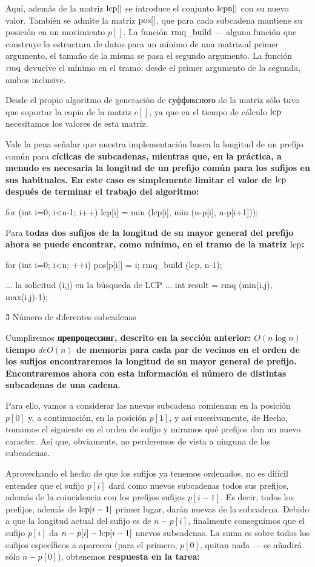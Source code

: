 Aquí, además de la matriz $\rm lcp[]$ se introduce el conjunto $\rm lcpn[]$ con su nuevo valor. También se admite la matriz $\rm pos[]$, que para cada subcadena mantiene su posición en un movimiento $p[]$. La función $\rm rmq\_build$ --- alguna función que construye la estructura de datos para un mínimo de una matriz-al primer argumento, el tamaño de la misma se pasa el segundo argumento. La función $\rm rmq$ devuelve el mínimo en el tramo: desde el primer argumento de la segunda, ambos inclusive.

Desde el propio algoritmo de generación de суффиксного de la matriz sólo tuvo que soportar la copia de la matriz $c[]$, ya que en el tiempo de cálculo $\rm lcp$ necesitamos los valores de esta matriz.

Vale la pena señalar que nuestra implementación busca la longitud de un prefijo común para \bf{cíclicas de subcadenas}, mientras que, en la práctica, a menudo es necesaria la longitud de un prefijo común para los sufijos en sus habituales. En este caso es simplemente limitar el valor de $\rm lcp$ después de terminar el trabajo del algoritmo:

\code
for (int i=0; i<n-1; i++)
lcp[i] = min (lcp[i], min (n-p[i], n-p[i+1]));
\endcode

Para \bf{todas} dos sufijos de la longitud de su mayor general del prefijo ahora se puede encontrar, como mínimo, en el tramo de la matriz $\rm lcp$:

\code
for (int i=0; i<n; ++i)
pos[p[i]] = i;
rmq_build (lcp, n-1);

... la solicitud (i,j) en la búsqueda de LCP ...
int result = rmq (min(i,j), max(i,j)-1);
\endcode


\h3{ Número de diferentes subcadenas }

Cumpliremos \bf{препроцессинг}, descrito en la sección anterior: $O(n \log n)$ tiempo $de O(n)$ de memoria para cada par de vecinos en el orden de los sufijos encontraremos la longitud de su mayor general de prefijo. Encontraremos ahora con esta información el número de distintas subcadenas de una cadena.

Para ello, vamos a considerar las nuevas subcadena comienzan en la posición $p[0]$ y, a continuación, en la posición $p[1]$, y así sucesivamente, de Hecho, tomamos el siguiente en el orden de sufijo y miramos qué prefijos dan un nuevo caracter. Así que, obviamente, no perderemos de vista a ninguna de las subcadenas.

Aprovechando el hecho de que los sufijos ya tenemos ordenados, no es difícil entender que el sufijo $p[i]$ dará como nuevos subcadenas todos sus prefijos, además de la coincidencia con los prefijos sufijos $p[i-1]$. Es decir, todos los prefijos, además de ${\rm lcp}[i-1]$ primer lugar, darán nuevas de la subcadena. Debido a que la longitud actual del sufijo es de $n-p[i]$, finalmente conseguimos que el sufijo $p[i]$ da $n-p[i]-{\rm lcp}[i-1]$ nuevos subcadenas. La suma es sobre todos los sufijos específicos a aparecen (para el primero, $p[0]$, quitan nada --- se añadirá sólo $n-p[0]$), obtenemos \bf{respuesta} en la tarea:


